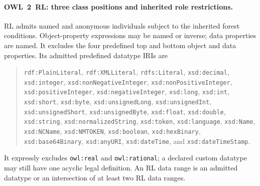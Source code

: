 \paragraph{OWL~2~RL: three class positions and inherited role restrictions.}
RL admits named and anonymous individuals subject to the inherited forest
conditions.  Object-property expressions may be named or inverse; data
properties are named.  It excludes the four predefined top and bottom object
and data properties.  Its admitted predefined datatype IRIs are
\begin{quote}\small
\texttt{rdf:PlainLiteral}, \texttt{rdf:XMLLiteral},
\texttt{rdfs:Literal}, \texttt{xsd:decimal}, \texttt{xsd:integer},
\texttt{xsd:nonNegativeInteger}, \texttt{xsd:nonPositiveInteger},
\texttt{xsd:positiveInteger}, \texttt{xsd:negativeInteger},
\texttt{xsd:long}, \texttt{xsd:int}, \texttt{xsd:short},
\texttt{xsd:byte}, \texttt{xsd:unsignedLong}, \texttt{xsd:unsignedInt},
\texttt{xsd:unsignedShort}, \texttt{xsd:unsignedByte},
\texttt{xsd:float}, \texttt{xsd:double}, \texttt{xsd:string},
\texttt{xsd:normalizedString}, \texttt{xsd:token},
\texttt{xsd:language}, \texttt{xsd:Name}, \texttt{xsd:NCName},
\texttt{xsd:NMTOKEN}, \texttt{xsd:boolean}, \texttt{xsd:hexBinary},
\texttt{xsd:base64Binary}, \texttt{xsd:anyURI}, \texttt{xsd:dateTime},
and \texttt{xsd:dateTimeStamp}.
\end{quote}
It expressly excludes \texttt{owl:real} and \texttt{owl:rational}; a declared
custom datatype may still have one acyclic legal definition.  An RL data range
is an admitted datatype or an intersection of at least two RL data ranges.

